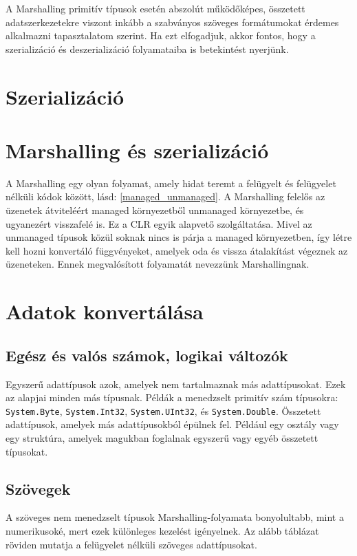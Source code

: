 \documentclass[tocnopagenum]{thesis-ekf}
\theoremstyle{definition}
\theoremstyle{remark}
\begin{document}
	A Marshalling primitív típusok esetén abszolút működőképes, összetett adatszerkezetekre viszont inkább a szabványos szöveges formátumokat érdemes alkalmazni tapasztalatom szerint. Ha ezt elfogadjuk, akkor fontos, hogy a szerializáció és deszerializáció folyamataiba is betekintést nyerjünk.
	\section{Szerializáció}
	\cite{sof_serialization}
	\section{Marshalling és szerializáció}
		A Marshalling egy olyan folyamat, amely hidat teremt a felügyelt és felügyelet nélküli kódok között, lásd: \ref{managed_unmanaged}. A Marshalling felelős az üzenetek átviteléért managed környezetből unmanaged környezetbe, és ugyanezért visszafelé is. Ez a CLR egyik alapvető szolgáltatása. Mivel az unmanaged típusok közül soknak nincs is párja a managed környezetben, így létre kell hozni konvertáló függvényeket, amelyek oda és vissza átalakítást végeznek az üzeneteken. Ennek megvalósított folyamatát nevezzünk Marshallingnak.
		\cite{marshalling_serialization}
	\section{Adatok konvertálása}
	\subsection{Egész és valós számok, logikai változók}
	Egyszerű adattípusok azok, amelyek nem tartalmaznak más adattípusokat. Ezek az alapjai minden más típusnak. Példák a menedzselt primitív szám típusokra: \verb*|System.Byte|, \verb*|System.Int32|, \verb*|System.UInt32|, és \verb*|System.Double|.
	Összetett adattípusok, amelyek más adattípusokból épülnek fel. Például egy osztály vagy egy struktúra, amelyek magukban foglalnak egyszerű vagy egyéb összetett típusokat.
	\cite{marsh}
	\subsection{Szövegek}
		A szöveges nem menedzselt típusok Marshalling-folyamata bonyolultabb, mint a numerikusoké, mert ezek különleges kezelést igényelnek. Az alább táblázat röviden mutatja a felügyelet nélküli szöveges adattípusokat.
		
\end{document}
